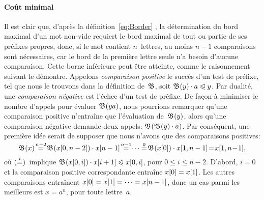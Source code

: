 \paragraph{Coût minimal}

Il est clair que, d'après la définition~\eqref{eq:Border}
, la détermination du bord maximal d'un mot
non-vide requiert le bord maximal de tout ou partie de ses préfixes
propres, donc, si le mot contient \(n\)~lettres, au moins \(n-1\)
comparaisons sont nécessaires, car le bord de la première lettre seule
n'a besoin d'aucune comparaison. Cette borne inférieure peut être
atteinte, comme le raisonnement suivant le démontre. Appelons
\emph{comparaison positive} le succès d'un test de préfixe,
tel que nous le trouvons dans la définition de~\(\mathfrak{B}\), soit
\(\mathfrak{B}^{}(y) \cdot a \mathrel{\trianglelefteqslant} y\). Par dualité, une \emph{comparaison
  négative} est
l'échec d'un test de préfixe. De façon à minimiser le nombre d'appels
pour évaluer \(\mathfrak{B}^{}(ya)\), nous pourrions remarquer qu'une
comparaison positive n'entraîne que l'évaluation de~\(\mathfrak{B}^{}(y)\),
alors qu'une comparaison négative demande deux appels:
\(\mathfrak{B}^{}(\mathfrak{B}^{}(y) \cdot a)\). Par conséquent, une première idée
serait de supposer que nous n'avons que des comparaisons positives:
\begin{equation*}
\Border{}{x} \!\eqn{n-2}\!
\Border{}{\ind{x}{0,n-2}} \cdot \ind{x}{n-1}
\!\eqn{n-1}\!\! \dots
\eqn{0}\! \Border{}{\ind{x}{0}} \cdot \ind{x}{1,n-1}
\!=\! \ind{x}{1,n\!-\!1},
\end{equation*}
où \((\smash{\mathrel{\stackrel{\smash{i}}{=}}})\)~implique \(\mathfrak{B}^{}({x}[{0,i}]) \cdot
{x}[{i+1}] \mathrel{\trianglelefteqslant} {x}[{0,i}]\), pour \(0 \leqslant i \leqslant
n-2\). D'abord, \(i=0\) et la comparaison positive correspondante
entraîne \({x}[{0}] = {x}[{1}]\). Les autres comparaisons
entraînent \({x}[{0}] = {x}[{1}] = \dots = {x}[{n-1}]\), donc un
cas parmi les meilleurs est \(x=a^n\), pour toute lettre~\(a\).


